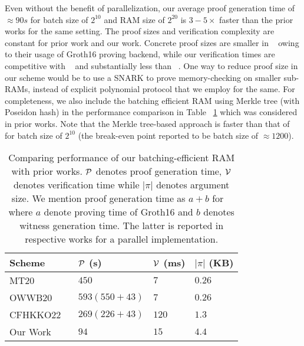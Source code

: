 Even without the benefit of parallelization, our average proof generation
time of $\approx 90s$ for batch size of $2^{10}$ and RAM size of $2^{20}$ is $3-5\times$ faster than the prior works
for the same setting. The proof sizes and verification complexity are constant for prior work and our work.
Concrete proof sizes are smaller in ~\cite{USENIX:OWWB20,CCS:CFHKKO22} owing to their usage of \textsf{Groth16}
proving backend, while our verification times are competitive with ~\cite{USENIX:OWWB20} and substantially
less than ~\cite{CCS:CFHKKO22}. One way to reduce proof size in our scheme would be to use a SNARK to prove
memory-checking on smaller sub-RAMs, instead of explicit polynomial protocol that we employ for the same. For
completeness, we also include the batching efficient RAM using Merkle tree (with Poseidon hash) in the performance
comparison in Table ~\ref{tbl:performance-comparison} which was considered in prior works. Note that the Merkle
 tree-based approach is faster than that of ~\cite{USENIX:OWWB20} for batch size of $2^{10}$ (the break-even
 point reported to be batch size of $\approx 1200$).

\begin{table}[htbp]
    \centering
    \begin{tabularx}{0.49\textwidth}{@{}XXXX@{}}
        \toprule
        Scheme & $\mathcal{P}$ (s) & $\mathcal{V}$ (ms) & $|\pi|$ (KB) \\ \midrule
        MT20 & $450$ & $7$  & $0.26$ \\
        OWWB20 ~\cite{USENIX:OWWB20} & $593 (550+43)$ & $7$  & $0.26$ \\
        CFHKKO22 ~\cite{CCS:CFHKKO22} & $269 (226+43)$ & $120$ & $1.3$ \\
        Our Work & $94$ & $15$ & $4.4$ \\
        \bottomrule
    \end{tabularx}
    \caption{Comparing performance of our batching-efficient RAM with prior works. $\mathcal{P}$
    denotes proof generation time, $\mathcal{V}$ denotes verification time while $|\pi|$ denotes
    argument size. We mention proof generation time as $a+b$ for ~\cite{USENIX:OWWB20,CCS:CFHKKO22}
    where $a$ denote proving time of \textsf{Groth16} and $b$ denotes witness generation time. The latter
    is reported in respective works for a parallel implementation.}
    \label{tbl:performance-comparison}
\end{table}



